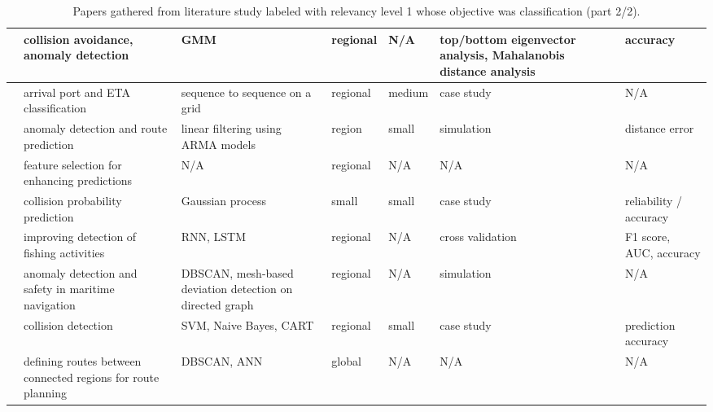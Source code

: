\noindent
\begin{table}[htbp]
{\small\begin{tabularx}{1.2\textwidth}{p{0.6in} X X p{0.5in} p{0.4in} X p{0.5in}}
    \midrule
    \cite{Murray2020UnsupervisedNavigation} & collision avoidance, anomaly detection & GMM & regional & N/A & top/bottom eigenvector analysis, Mahalanobis distance analysis & accuracy \\ \midrule
    \cite{Nguyen2018GrandGrid} & arrival port and ETA classification & sequence to sequence on a grid & regional & medium & case study & N/A \\ \midrule
    \cite{Patmanidis2016MaritimeData} & anomaly detection and route prediction & linear filtering using ARMA models & region & small & simulation & distance error \\ \midrule
    \cite{Prochazka2020FeatureTransportation} & feature selection for enhancing predictions & N/A & regional & N/A & N/A & N/A \\ \midrule
    \cite{Rong2020CollisionTrajectories} & collision probability prediction & Gaussian process & small & small & case study & reliability / accuracy \\ \midrule
    \cite{Shen2020ALearning} & improving detection of fishing activities & RNN, LSTM & regional & N/A & cross validation & F1 score, AUC, accuracy \\ \midrule
    \cite{Tang2020DetectionModel} & anomaly detection and safety in maritime navigation & DBSCAN, mesh-based deviation detection on directed graph & regional & N/A & simulation & N/A \\ \midrule
    \cite{Watawana2018AnalyseDataset} & collision detection & SVM, Naive Bayes, CART & regional & small & case study & prediction accuracy \\ \midrule
    \cite{Wen2020AutomaticMethod} & defining routes between connected regions for route planning & DBSCAN, ANN & global & N/A & N/A & N/A \\ \bottomrule
\end{tabularx}}
\caption{Papers gathered from literature study labeled with relevancy level 1 whose objective was classification (part 2/2).}
\label{tab:lit_review_cat_1_6}
\end{table}



